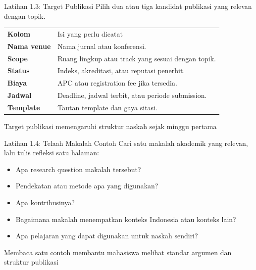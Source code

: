 \documentclass[aspectratio=169, table]{beamer}
\newcommand{\takeaway}[1]{%
  \vspace{4pt}
  {\footnotesize #1}
}
\begin{document}
\begin{frame}{Latihan 1.3: Target Publikasi}
  \vspace{8pt}
  Pilih dua atau tiga kandidat publikasi yang relevan dengan topik.

  \vspace{8pt}
  \footnotesize
  \begin{tabularx}{\textwidth}{>{\bfseries}p{}X}
    \rowcolor{praditagreen!18}
    Kolom & Isi yang perlu dicatat \\
    Nama venue & Nama jurnal atau konferensi. \\
    Scope & Ruang lingkup atau track yang sesuai dengan topik. \\
    Status & Indeks, akreditasi, atau reputasi penerbit. \\
    Biaya & APC atau registration fee jika tersedia. \\
    Jadwal & Deadline, jadwal terbit, atau periode submission. \\
    Template & Tautan template dan gaya sitasi. \\
  \end{tabularx}

  \takeaway{Target publikasi memengaruhi struktur naskah sejak minggu pertama}
\end{frame}

\begin{frame}{Latihan 1.4: Telaah Makalah Contoh}
  \vspace{10pt}
  Cari satu makalah akademik yang relevan, lalu tulis refleksi satu halaman:

  \vspace{6pt}
  \begin{itemize}
    \item Apa research question makalah tersebut?
    \item Pendekatan atau metode apa yang digunakan?
    \item Apa kontribusinya?
    \item Bagaimana makalah menempatkan konteks Indonesia atau konteks lain?
    \item Apa pelajaran yang dapat digunakan untuk naskah sendiri?
  \end{itemize}

  \takeaway{Membaca satu contoh membantu mahasiswa melihat standar argumen dan struktur publikasi}
\end{frame}
\end{document}
